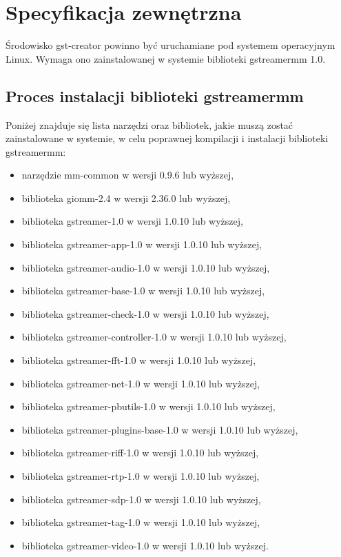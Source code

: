 \documentclass[12pt]{article}
\begin{document}
\section{Specyfikacja zewnętrzna}
Środowisko gst-creator powinno być uruchamiane pod systemem operacyjnym Linux. Wymaga ono zainstalowanej w systemie biblioteki gstreamermm 1.0.
\subsection{Proces instalacji biblioteki gstreamermm}
Poniżej znajduje się lista narzędzi oraz bibliotek, jakie muszą zostać zainstalowane w systemie, w celu poprawnej kompilacji i instalacji biblioteki gstreamermm:
\begin{itemize}
  \setlength{\itemsep}{0em}
\item narzędzie mm-common w wersji 0.9.6 lub wyższej,
\item biblioteka giomm-2.4 w wersji 2.36.0 lub wyższej,
\item biblioteka gstreamer-1.0 w wersji 1.0.10 lub wyższej,
\item biblioteka gstreamer-app-1.0 w wersji 1.0.10 lub wyższej,
\item biblioteka gstreamer-audio-1.0 w wersji 1.0.10 lub wyższej,
\item biblioteka gstreamer-base-1.0 w wersji 1.0.10 lub wyższej,
\item biblioteka gstreamer-check-1.0 w wersji 1.0.10 lub wyższej,
\item biblioteka gstreamer-controller-1.0 w wersji 1.0.10 lub wyższej,
\item biblioteka gstreamer-fft-1.0 w wersji 1.0.10 lub wyższej,
\item biblioteka gstreamer-net-1.0 w wersji 1.0.10 lub wyższej,
\item biblioteka gstreamer-pbutils-1.0 w wersji 1.0.10 lub wyższej,
\item biblioteka gstreamer-plugins-base-1.0 w wersji 1.0.10 lub wyższej,
\item biblioteka gstreamer-riff-1.0 w wersji 1.0.10 lub wyższej,
\item biblioteka gstreamer-rtp-1.0 w wersji 1.0.10 lub wyższej,
\item biblioteka gstreamer-sdp-1.0 w wersji 1.0.10 lub wyższej,
\item biblioteka gstreamer-tag-1.0 w wersji 1.0.10 lub wyższej,
\item biblioteka gstreamer-video-1.0 w wersji 1.0.10 lub wyższej.
\end{itemize}
\end{document}
